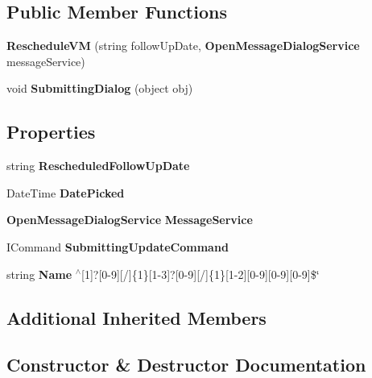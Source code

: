 \subsection*{Public Member Functions}
\begin{DoxyCompactItemize}
\item 
\textbf{ Reschedule\+VM} (string follow\+Up\+Date, \textbf{ Open\+Message\+Dialog\+Service} message\+Service)
\item 
void \textbf{ Submitting\+Dialog} (object obj)
\end{DoxyCompactItemize}
\subsection*{Properties}
\begin{DoxyCompactItemize}
\item 
string \textbf{ Rescheduled\+Follow\+Up\+Date}\hspace{0.3cm}{\ttfamily  [get, set]}
\item 
Date\+Time \textbf{ Date\+Picked}\hspace{0.3cm}{\ttfamily  [get, set]}
\item 
\textbf{ Open\+Message\+Dialog\+Service} \textbf{ Message\+Service}\hspace{0.3cm}{\ttfamily  [get, set]}
\item 
I\+Command \textbf{ Submitting\+Update\+Command}\hspace{0.3cm}{\ttfamily  [get]}
\item 
string \textbf{ Name} $^\wedge$[1]?[0-\/9][/]\{1\}[1-\/3]?[0-\/9][/]\{1\}[1-\/2][0-\/9][0-\/9][0-\/9]\$\char`\"{}\hspace{0.3cm}{\ttfamily  [get]}
\end{DoxyCompactItemize}
\subsection*{Additional Inherited Members}


\subsection{Constructor \& Destructor Documentation}
\mbox{\label{class_a_f_h___scheduler_1_1_complete_1_1_reschedule_v_m_a0db67820ecad13ab498398ebf63ef3cd}} 
